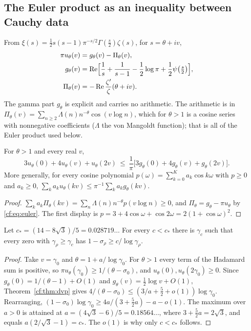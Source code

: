 \subsection{The Euler product as an inequality between Cauchy data}

From $\xi(s)=\frac12s(s-1)\pi^{-s/2}\Gamma(\frac s2)\zeta(s)$, for $s=\theta+iv$,
\begin{equation}\label{cf:eq:euler}
\begin{split}
\pi u_\theta(v)&=g_\theta(v)-\Pi_\theta(v),\\
g_\theta(v)&=\Re\Bigl[\frac1s+\frac1{s-1}-\frac12\log\pi+\frac12\psi\bigl(\tfrac s2\bigr)\Bigr],\\
\Pi_\theta(v)&=-\Re\frac{\zeta'}\zeta(\theta+iv).
\end{split}
\end{equation}
The gamma part $g_\theta$ is explicit and carries no arithmetic. The arithmetic is in $\Pi_\theta(v)=\sum_{n\ge2}\Lambda(n)n^{-\theta}\cos(v\log n)$, which for $\theta>1$ is a cosine series with nonnegative coefficients ($\Lambda$ the von Mangoldt function); that is all of the Euler product used below.

\begin{theorem}\label{cf:thm:dvp}
For $\theta>1$ and every real $v$,
\[
3u_\theta(0)+4u_\theta(v)+u_\theta(2v)\ \le\ \frac1\pi\bigl[3g_\theta(0)+4g_\theta(v)+g_\theta(2v)\bigr].
\]
More generally, for every cosine polynomial $p(\omega)=\sum_{k=0}^Ka_k\cos k\omega$ with $p\ge0$ and $a_k\ge0$, $\sum_ka_ku_\theta(kv)\le\pi^{-1}\sum_ka_kg_\theta(kv)$.
\end{theorem}

\begin{proof}
$\sum_ka_k\Pi_\theta(kv)=\sum_n\Lambda(n)n^{-\theta}p(v\log n)\ge0$, and $\Pi_\theta=g_\theta-\pi u_\theta$ by \eqref{cf:eq:euler}. The first display is $p=3+4\cos\omega+\cos2\omega=2(1+\cos\omega)^2$.
\end{proof}

\begin{corollary}\label{cf:cor:zfr}
Let $c_\ast=(14-8\sqrt3)/5=0.028719\ldots$ For every $c<c_\ast$ there is $\gamma_c$ such that every zero with $\gamma_\rho\ge\gamma_c$ has $1-\sigma_\rho\ge c/\log\gamma_\rho$.
\end{corollary}

\begin{proof}
Take $v=\gamma_0$ and $\theta=1+a/\log\gamma_0$. For $\theta>1$ every term of the Hadamard sum is positive, so $\pi u_\theta(\gamma_0)\ge1/(\theta-\sigma_0)$, and $u_\theta(0),u_\theta(2\gamma_0)\ge0$. Since $g_\theta(0)=1/(\theta-1)+O(1)$ and $g_\theta(v)=\frac12\log v+O(1)$, Theorem~\ref{cf:thm:dvp} gives $4/(\theta-\sigma_0)\le(3/a+\frac52+o(1))\log\gamma_0$. Rearranging, $(1-\sigma_0)\log\gamma_0\ge4a/(3+\frac52a)-a-o(1)$. The maximum over $a>0$ is attained at $a=(4\sqrt3-6)/5=0.18564\ldots$, where $3+\frac52a=2\sqrt3$, and equals $a(2/\sqrt3-1)=c_\ast$. The $o(1)$ is why only $c<c_\ast$ follows.
\end{proof}

